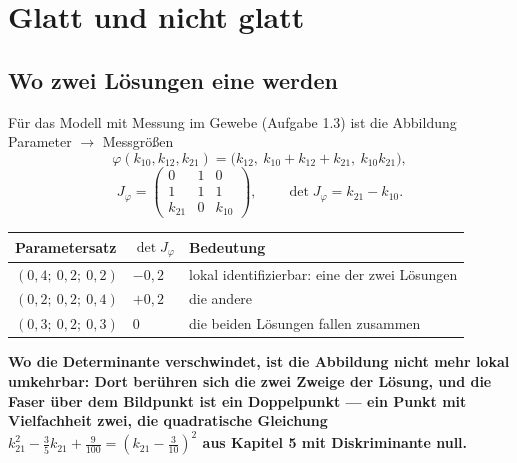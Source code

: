 \chapter{Glatt und nicht glatt}

\section{Wo zwei Lösungen eine werden}

\begin{merksatz}
Für das Modell mit Messung im Gewebe (Aufgabe 1.3) ist die Abbildung Parameter $\to$ Messgrößen
\[ \varphi(k_{10}, k_{12}, k_{21}) = \bigl(k_{12},\ k_{10} + k_{12} + k_{21},\ k_{10}k_{21}\bigr), \]
\[ J_\varphi = \begin{pmatrix}0 & 1 & 0\\ 1 & 1 & 1\\ k_{21} & 0 & k_{10}\end{pmatrix}, \qquad \det J_\varphi = k_{21} - k_{10} . \]

\begin{center}
{\small
\renewcommand{\arraystretch}{1.5}
\begin{tabular}{@{}P{3.0cm}P{1.6cm}P{3.6cm}@{}}
\toprule
\textbf{Parametersatz} & $\det J_\varphi$ & \textbf{Bedeutung}\\
\midrule
$(0{,}4;\ 0{,}2;\ 0{,}2)$ & $-0{,}2$ & lokal identifizierbar: eine der zwei Lösungen\\
$(0{,}2;\ 0{,}2;\ 0{,}4)$ & $+0{,}2$ & die andere\\
$(0{,}3;\ 0{,}2;\ 0{,}3)$ & $0$ & die beiden Lösungen fallen zusammen\\
\bottomrule
\end{tabular}}
\end{center}

\begin{center}
\begin{minipage}{0.9\textwidth}
\textbf{Wo die Determinante verschwindet, ist die Abbildung nicht mehr lokal umkehrbar: Dort berühren sich die zwei Zweige der Lösung, und die Faser über dem Bildpunkt ist ein Doppelpunkt --- ein Punkt mit Vielfachheit zwei, die quadratische Gleichung $k_{21}^{2} - \tfrac35k_{21} + \tfrac{9}{100} = (k_{21} - \tfrac{3}{10})^{2}$ aus Kapitel 5 mit Diskriminante null.}
\end{minipage}
\end{center}


\end{merksatz}
